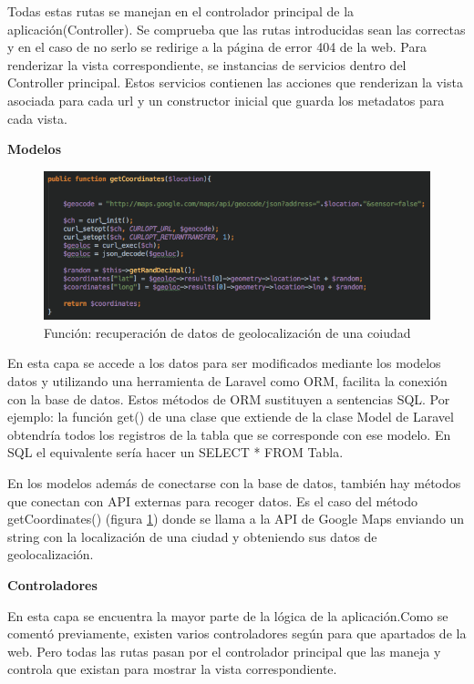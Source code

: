 Todas estas rutas se manejan en el controlador principal de la aplicación(Controller). Se comprueba que las rutas introducidas sean las correctas y en el caso de no serlo se redirige a la página de error 404 de la web. Para renderizar la vista correspondiente, se instancias de servicios dentro del Controller principal.
Estos servicios contienen las acciones que renderizan la vista asociada para cada url y un constructor inicial que guarda los metadatos para cada vista.

\vspace{5 mm}

\textbf{Modelos}

\begin{figure}
\begin{center}
\includegraphics[width=1.0\textwidth]{imagenes/getGeocode.png}
\caption{Función: recuperación de datos de geolocalización de una coiudad}
\label{getCordinates-app}
\end{center}
\end{figure}

En esta capa se accede a los datos para ser modificados mediante los modelos datos y utilizando una herramienta de Laravel como ORM, facilita la conexión
con la base de datos. Estos métodos de ORM sustituyen a sentencias SQL. Por ejemplo: la función get() de una clase que extiende de la clase Model de Laravel
obtendría todos los registros de la tabla que se corresponde con ese modelo. En SQL el equivalente sería hacer un SELECT * FROM Tabla.


En los modelos además de conectarse con la base de datos, también hay métodos que conectan con API externas para recoger datos. Es el caso del método getCoordinates()
(figura \ref{getCordinates-app}) donde se llama a la API de Google Maps enviando un string con la localización de una ciudad y obteniendo sus datos de
geolocalización.


\textbf{Controladores}

En esta capa se encuentra la mayor parte de la lógica de la aplicación.Como se comentó previamente, existen varios controladores según para que
apartados de la web. Pero todas las rutas pasan por el controlador principal que las maneja y controla que existan para mostrar la vista correspondiente.

